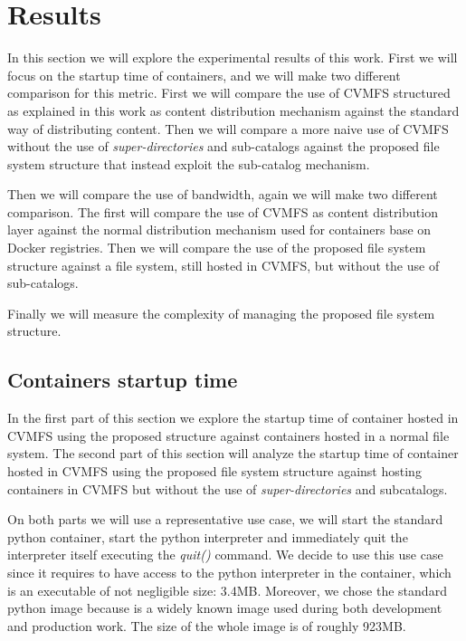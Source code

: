 \chapter{Results}\label{ch:Results}

In this section we will explore the experimental results of this work. First we
will focus on the startup time of containers, and we will make two different
comparison for this metric. First we will compare the use of CVMFS structured
as explained in this work as content distribution mechanism against the
standard way of distributing content. Then we will compare a more naive use of
CVMFS without the use of \textit{super-directories} and sub-catalogs against
the proposed file system structure that instead exploit the sub-catalog
mechanism. 

Then we will compare the use of bandwidth, again we will make two different
comparison. The first will compare the use of CVMFS as content distribution
layer against the normal distribution mechanism used for containers base on
Docker registries. Then we will compare the use of the proposed file system
structure against a file system, still hosted in CVMFS, but without the use of
sub-catalogs. 

Finally we will measure the complexity of managing the proposed file system
structure.

\section{Containers startup time}

In the first part of this section we explore the startup time of container
hosted in CVMFS using the proposed structure against containers hosted in a
normal file system. The second part of this section will analyze the startup
time of container hosted in CVMFS using the proposed file system structure
against hosting containers in CVMFS but without the use of
\textit{super-directories} and subcatalogs.

On both parts we will use a representative use case, we will start the standard
python container, start the python interpreter and immediately quit the
interpreter itself executing the \textit{quit()} command. We decide to use this
use case since it requires to have access to the python interpreter in the
container, which is an executable of not negligible size: 3.4MB. Moreover, we 
chose the standard python image because is a widely known image used during both
development and production work. The size of the whole image is of roughly 923MB.

